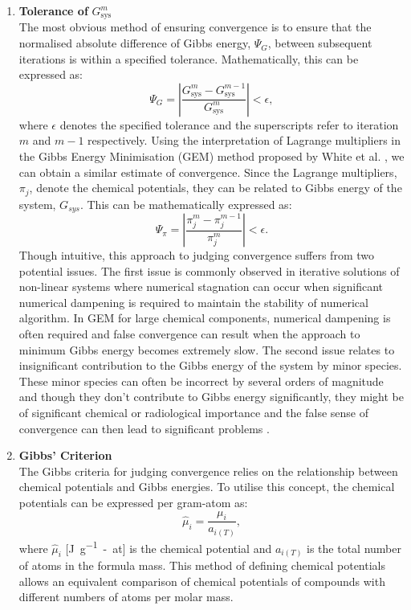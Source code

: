 	\begin{enumerate}
		\item \textbf{Tolerance of} $G_\text{sys}^m$\\
		The most obvious method of ensuring convergence is to ensure that the normalised absolute difference of Gibbs energy, $\Psi_G$, between subsequent iterations is within a specified tolerance. Mathematically, this can be expressed as:
		\begin{equation}\label{eqn:conv1}
			\Psi_G = \left \vert \frac{G_\text{sys}^{m} - G_\text{sys}^{m-1}}{G_\text{sys}^{m}} \right \vert < \epsilon,
		\end{equation}
		where $\epsilon$ denotes the specified tolerance and the superscripts refer to iteration $m$ and $m-1$ respectively. Using the interpretation of Lagrange multipliers in the Gibbs Energy Minimisation (GEM) method proposed by White et al. \cite{White:58}, we can obtain a similar estimate of convergence. Since the Lagrange multipliers, $\pi_{j}$, denote the chemical potentials, they can be related to Gibbs energy of the system, $G_{sys}$. This can be mathematically expressed as:
		\begin{equation}\label{eqn:conv2}
			\Psi_{\pi} = \left \vert \frac{\pi_{j}^{m} - \pi_{j}^{m-1}}{\pi_{j}^{m}} \right \vert < \epsilon.
		\end{equation}
		Though intuitive, this approach to judging convergence suffers from two potential issues. The first issue is commonly observed in iterative solutions of non-linear systems where numerical stagnation can occur when significant numerical dampening is required to maintain the stability of numerical algorithm. In GEM for large chemical components, numerical dampening is often required and false convergence can result when the approach to minimum Gibbs energy becomes extremely slow.  The second issue relates to insignificant contribution to the Gibbs energy of the system  by minor species. These minor species can often be incorrect by several orders of magnitude and though they don't contribute to Gibbs energy significantly, they might be of significant chemical or radiological importance and the false sense of convergence can then lead to significant problems \cite{Piro11a}.

		\item \textbf{Gibbs' Criterion}\\
	 The Gibbs criteria for judging convergence relies on the relationship between chemical potentials and Gibbs energies. To utilise this concept, the chemical potentials can be expressed per gram-atom as:
	 \begin{equation}
	 	\hat{\mu}_{i} = \frac{{\mu}_i}{a_{i(T)}},
	 \end{equation}
	 where $\hat{\mu}_{i}$ [\si{\joule \per g-at}] is the chemical potential and ${a_{i(T)}}$  is the total number of atoms in the formula mass. This method of defining chemical potentials allows an equivalent comparison of chemical potentials of compounds with different numbers of atoms per molar mass.


\end{enumerate}
